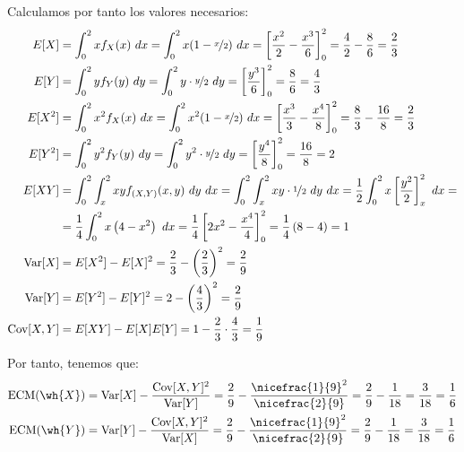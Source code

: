 \begin{ejercicio}
\begin{enumerate}
        Calculamos por tanto los valores necesarios:
        \begin{align*}
            E[X] &= \int_{0}^{2} x f_X(x) \ dx = \int_{0}^{2} x(1-\nicefrac{x}{2}) \ dx
            = \left[\dfrac{x^2}{2} - \dfrac{x^3}{6}\right]_{0}^{2}
            = \dfrac{4}{2} - \dfrac{8}{6} = \dfrac{2}{3}\\
            E[Y] &= \int_{0}^{2} y f_Y(y) \ dy = \int_{0}^{2} y\cdot \nicefrac{y}{2} \ dy
            = \left[\dfrac{y^3}{6}\right]_{0}^{2} = \dfrac{8}{6} = \frac{4}{3}\\
            E[X^2] &= \int_{0}^{2} x^2 f_X(x) \ dx = \int_{0}^{2} x^2(1-\nicefrac{x}{2}) \ dx
            = \left[\dfrac{x^3}{3} - \dfrac{x^4}{8}\right]_{0}^{2}
            = \dfrac{8}{3} - \dfrac{16}{8} = \dfrac{2}{3}\\
            E[Y^2] &= \int_{0}^{2} y^2 f_Y(y) \ dy = \int_{0}^{2} y^2\cdot \nicefrac{y}{2} \ dy
            = \left[\dfrac{y^4}{8}\right]_{0}^{2} = \dfrac{16}{8} = 2\\
            E[XY] &= \int_{0}^{2} \int_{x}^{2} xy f_{(X,Y)}(x, y) \ dy \ dx
            = \int_{0}^{2} \int_{x}^{2} xy\cdot \nicefrac{1}{2} \ dy \ dx
            = \frac{1}{2} \int_{0}^{2} x\left[\dfrac{y^2}{2}\right]_{x}^{2} \ dx
            =\\&= \frac{1}{4} \int_{0}^{2} x\left(4 - x^2\right) \ dx
            = \frac{1}{4} \left[2x^2 - \frac{x^4}{4}\right]_{0}^{2}
            = \frac{1}{4} \left(8 - 4\right) = 1\\
            \Var[X] &= E[X^2] - E[X]^2 = \frac{2}{3} - \left(\frac{2}{3}\right)^2 = \frac{2}{9}\\
            \Var[Y] &= E[Y^2] - E[Y]^2 = 2 - \left(\frac{4}{3}\right)^2 = \frac{2}{9}\\
            \Cov[X,Y] &= E[XY] - E[X]E[Y] = 1 - \frac{2}{3}\cdot \frac{4}{3} = \frac{1}{9}
        \end{align*}

        Por tanto, tenemos que:
        \begin{align*}
            \text{ECM}(\wh{X}) &= \Var[X] - \dfrac{\Cov[X,Y]^2}{\Var[Y]}
            = \frac{2}{9} - \dfrac{\nicefrac{1}{9}^2}{\nicefrac{2}{9}}
            = \frac{2}{9} - \frac{1}{18} = \frac{3}{18} = \frac{1}{6}\\
            \text{ECM}(\wh{Y}) &= \Var[Y] - \dfrac{\Cov[X,Y]^2}{\Var[X]}
            = \frac{2}{9} - \dfrac{\nicefrac{1}{9}^2}{\nicefrac{2}{9}}
            = \frac{2}{9} - \frac{1}{18} = \frac{3}{18} = \frac{1}{6}
        \end{align*}
    \end{enumerate}
\end{ejercicio}

